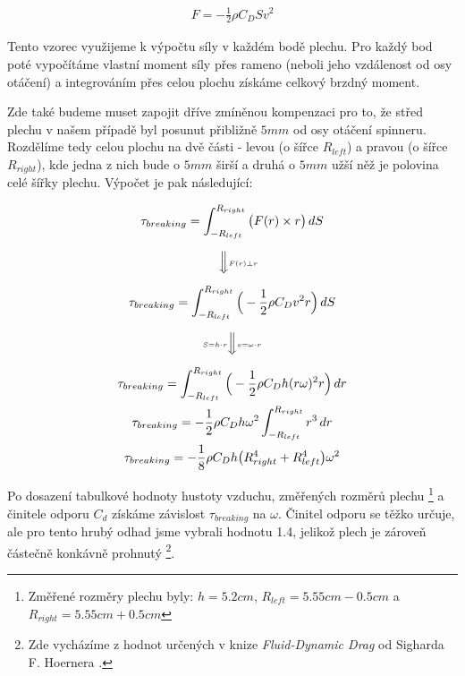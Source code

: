 \begin{equation}
    \label{eq:highschool_drag}
    \begin{gathered}
        F = -\frac{1}{2} \rho C_D S v^2
    \end{gathered}
\end{equation}

\clearpage

Tento vzorec využijeme k výpočtu síly v každém bodě plechu. Pro každý bod poté vypočítáme vlastní moment síly přes rameno (neboli jeho vzdálenost od osy otáčení) a integrováním přes celou plochu získáme celkový brzdný moment.

Zde také budeme muset zapojit dříve zmíněnou kompenzaci pro to, že střed plechu v našem případě byl posunut přibližně $5mm$ od osy otáčení spinneru. Rozdělíme tedy celou plochu na dvě části - levou (o šířce $R_{left}$) a pravou (o šířce $R_{right}$), kde jedna z nich bude o $5mm$ širší a druhá o $5mm$ užší něž je polovina celé šířky plechu. Výpočet je pak následující:

\begin{equation}
    \label{eq:breaking_torque}
    \begin{gathered}
        \tau_{breaking} = \int_{-R_{left}}^{R_{right}} \big( F(r) \times r \big) \,dS \\
        \quad \Big\Downarrow \scriptscriptstyle{F(r) \perp r} \vphantom{\Bigg(} \\
        \tau_{breaking} = \int_{-R_{left}}^{R_{right}} \Big( -\frac{1}{2} \rho C_D v^2 r \Big) \,dS \\
        \scriptscriptstyle{S = h \cdot r} \Big\Downarrow \scriptscriptstyle{v = \omega \cdot r} \vphantom{\Bigg(} \\
        \tau_{breaking} = \int_{-R_{left}}^{R_{right}} \Big( -\frac{1}{2} \rho C_D h (r \omega)^2 r \Big) \,dr \\
        \tau_{breaking} = -\frac{1}{2} \rho C_D h \omega^2 \int_{-R_{left}}^{R_{right}} r^3 \,dr \\
        \tau_{breaking} = -\frac{1}{8} \rho C_D h \big( R_{right}^4 + R_{left}^4 \big) \omega^2
    \end{gathered}
\end{equation}

Po dosazení tabulkové hodnoty hustoty vzduchu, změřených rozměrů plechu \footnote{Změřené rozměry plechu byly: $h = 5.2cm$, $R_{left} = 5.55cm - 0.5cm$ a $R_{right} = 5.55cm + 0.5cm$} a činitele odporu $C_d$ získáme závislost $\tau_{breaking}$ na $\omega$. Činitel odporu se těžko určuje, ale pro tento hrubý odhad jsme vybrali hodnotu 1.4, jelikož plech je zároveň částečně konkávně prohnutý \footnote{Zde vycházíme z hodnot určených v knize \textit{Fluid-Dynamic Drag} od Sigharda F. Hoernera \cite{plate_drag_coef}.}.

